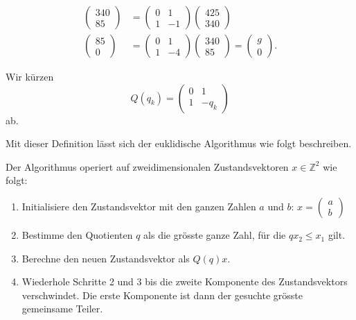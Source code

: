 \begin{align*}
\\
\begin{pmatrix} 340 \\ 85 \end{pmatrix}
&=
\begin{pmatrix} 0&1\\1&-1 \end{pmatrix}
\begin{pmatrix} 425 \\ 340 \end{pmatrix}
\\
\begin{pmatrix} 85 \\ 0 \end{pmatrix}
&=
\begin{pmatrix} 0&1\\1&-4 \end{pmatrix}
\begin{pmatrix} 340 \\ 85 \end{pmatrix}
=
\begin{pmatrix}g\\0\end{pmatrix}.
\end{align*}

\begin{definition}
Wir kürzen
\[
Q(q_k) = \begin{pmatrix} 0 & 1 \\ 1 & -q_k \end{pmatrix}
\]
ab.
\end{definition}

Mit dieser Definition lässt sich der euklidische Algorithmus wie folgt
beschreiben.

\begin{algorithmus}[Euklid]
\label{lifting:euklid}
Der Algorithmus operiert auf zweidimensionalen Zustandsvektoren
$x\in\mathbb Z^2$ 
wie folgt:
\begin{enumerate}
\item Initialisiere  den Zustandsvektor mit den ganzen Zahlen $a$ und $b$:
$\displaystyle x = \begin{pmatrix}a\\b\end{pmatrix}$
\item Bestimme den Quotienten $q$ als die grösste ganze Zahl,
für die $qx_2\le x_1$ gilt.
\item Berechne den neuen Zustandsvektor als $Q(q)x$.
\item Wiederhole Schritte 2 und 3 bis die zweite Komponente des Zustandsvektors
verschwindet.
Die erste Komponente ist dann der gesuchte grösste gemeinsame Teiler.
\end{enumerate}
\end{algorithmus}

